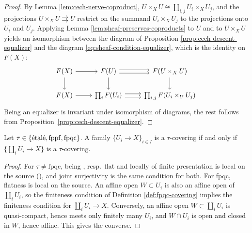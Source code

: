 \begin{proof}
	By Lemma \ref{lem:cech-nerve-coproduct}, $U\times_XU\cong\coprod_{i,j}U_i\times_XU_j$, and the projections $U\times_XU\rightrightarrows U$ restrict on the summand $U_i\times_XU_j$ to the projections onto $U_i$ and $U_j$. Applying Lemma \ref{lem:sheaf-preserves-coproducts} to $U$ and to $U\times_XU$ yields  an isomorphism between the diagram of Proposition \ref{prop:cech-descent-equalizer} and the diagram \eqref{eq:sheaf-condition-equalizer}, which is the identity on $F(X)$:
	\[\begin{tikzcd}
		{F(X)} & {F(U)} & {F(U\times_X U)} \\
		{F(X)} & {\prod_iF(U_i)} & {\prod_{i,j}F(U_i\times_UU_j)}
		\arrow[from=1-1, to=1-2]
		\arrow[from=1-1, to=2-1]
		\arrow[shift right, from=1-2, to=1-3]
		\arrow[shift left, from=1-2, to=1-3]
		\arrow[from=1-2, to=2-2]
		\arrow[from=1-3, to=2-3]
		\arrow[from=2-1, to=2-2]
		\arrow[shift right, from=2-2, to=2-3]
		\arrow[shift left, from=2-2, to=2-3]
	\end{tikzcd}\]
	Being an equalizer is invariant under isomorphism of diagrams, the rest follows from Proposition~\ref{prop:cech-descent-equalizer}.
\end{proof}

\begin{lemma}\label{lem:coverings-vs-single-morphism}
	Let $\tau\in\{\text{\'etal\'e}, \mathrm{fppf}, \mathrm{fpqc}\}$. A family $\{U_i\to X\}_{i\in I}$ is a $\tau$-covering if and only if $\{\coprod_iU_i\to X\}$ is a $\tau$-covering.
\end{lemma}

\begin{proof}
	For $\tau\ne\mathrm{fpqc}$, being \etale, resp.\ flat and locally of finite presentation is local on the source (\cite[][Tag 02GJ, 01V6, 01U4]{stacks-project}), and joint surjectivity is the same condition for both. For fpqc, flatness is local on the source. An affine open $W\subset U_{i}$ is also an affine open of $\coprod_iU_i$, so the finiteness condition of Definition \ref{def:fpqc-covering} implies the finiteness condition for $\coprod_iU_i\to X$. Conversely, an affine open $W\subset\coprod_iU_i$ is quasi-compact, hence meets only finitely many $U_i$, and $W\cap U_i$ is open and closed in $W$, hence affine. This gives the converse.
\end{proof}

